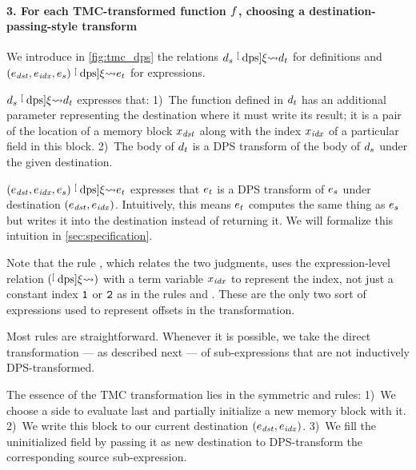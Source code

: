 \paragraph{3. For each TMC-transformed function $\datalangFn$, choosing a destination-passing-style transform}
We introduce in \cref{fig:tmc_dps} the relations $\datalangDef_s \tmcDps{\datalangRenaming} \datalangDef_t$ for definitions and $(\datalangExpr_\mathit{dst}, \datalangExpr_\mathit{idx}, \datalangExpr_s) \tmcDps{\datalangRenaming} \datalangExpr_t$ for expressions.

$\datalangDef_s \tmcDps{\datalangRenaming} \datalangDef_t$ expresses that:
1)~The function defined in $\datalangDef_t$ has an additional parameter representing the destination where it must write its result; it is a pair of the location of a memory block $\datalangVar_\mathit{dst}$ along with the index $\datalangVar_\mathit{idx}$ of a particular field in this block.
2)~The body of $\datalangDef_t$ is a DPS transform of the body of $\datalangDef_s$ under the given destination.

$(\datalangExpr_\mathit{dst}, \datalangExpr_\mathit{idx}, \datalangExpr_s) \tmcDps{\datalangRenaming} \datalangExpr_t$ expresses that $\datalangExpr_t$ is a DPS transform of $\datalangExpr_s$ under destination $(\datalangExpr_\mathit{dst}, \datalangExpr_\mathit{idx})$.
Intuitively, this means $\datalangExpr_t$ computes the same thing as $\datalangExpr_s$ but writes it into the destination instead of returning it.
We will formalize this intuition in \cref{sec:specification}.

Note that the rule , which relates the two judgments, uses the expression-level relation $(\mathrel{\stackrel[\scriptscriptstyle\textrm{dps}]{ \xi }{ \rightsquigarrow }})$ with a term variable $\datalangVar_\mathit{idx}$ to represent the index, not just a constant index $\texttt{1}$ or $\texttt{2}$ as in the rules  and . These are the only two sort of expressions used to represent offsets in the transformation.

Most rules are straightforward.
Whenever it is possible, we take the direct transformation --- as described next --- of sub-expressions that are not inductively DPS-transformed.

The essence of the TMC transformation lies in the symmetric  and  rules:
1)~We choose a side to evaluate last and partially initialize a new memory block with it.
2)~We write this block to our current destination $(%
  \datalangExpr_\mathit{dst},%
  \datalangExpr_\mathit{idx})$.
3)~We fill the uninitialized field by passing it as new destination to DPS-transform the corresponding source sub-expression.

